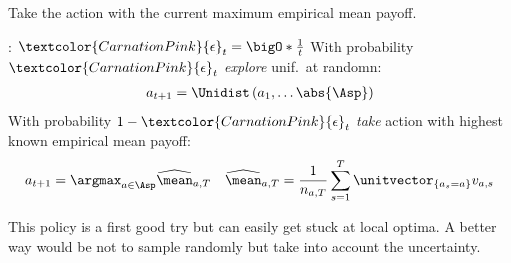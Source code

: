 \begin{defnbox}\nospacing
  \begin{defn}\label{defn:pure_exploration_follow_the_leader}
    Take the action with the current maximum empirical mean payoff.
  \end{defn}
\end{defnbox}
\begin{algorithmbox}\nospacing
  \begin{algo}\label{algo:epsilon_algorithm}\leavevmode
    \begin{algorithmic}[1]
      \item[] : $\textcolor{CarnationPink}{\epsilon}_{t}=\bigO*{\frac{1}{t}}$
        \State With probability $\textcolor{CarnationPink}{\epsilon}_t$ \textit{explore} unif.\ at randomn:
        \begin{align}
          a_{t+1}=\Unidist \left(a_1,\ldots\abs{\Asp}\right)
        \end{align}
        \State With probability $1-\textcolor{CarnationPink}{\epsilon}_t$ \textit{take} action with highest known empirical mean payoff:
        \begin{align}
            a_{t+1}=\argmax_{a\in\Asp}\widehat{\mean}_{a,T}&&\widehat{\mean}_{a,T}=\frac{1}{n_{a,T}}\sum_{s=1}^{T}\unitvector_{\{a_s=a\}}v_{a,s}
        \end{align}
        \EndFor
    \end{algorithmic}
  \end{algo}
\end{algorithmbox}
\begin{notebox}[Problem]\nospacing
  This policy is a first good try but can easily get stuck at local optima.
  A better way would be not to sample randomly but take into account the uncertainty.
\end{notebox}

